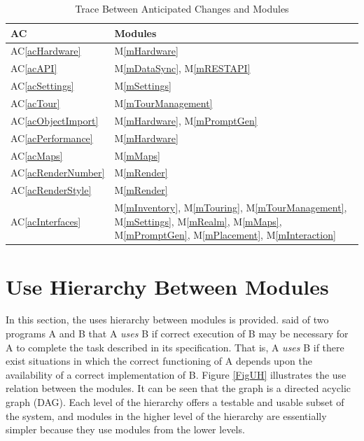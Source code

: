 \documentclass[12pt, titlepage]{article}
\newcommand{\acref}[1]{AC\ref{#1}}
\newcommand{\mref}[1]{M\ref{#1}}
\begin{document}
\begin{table}[H]
\centering
\begin{tabular}{p{} p{}}
\toprule
\textbf{AC} & \textbf{Modules}\\
\midrule
\acref{acHardware} & \mref{mHardware}\\
\acref{acAPI} & \mref{mDataSync}, \mref{mRESTAPI}\\
\acref{acSettings} & \mref{mSettings}\\
\acref{acTour} & \mref{mTourManagement}\\
\acref{acObjectImport} & \mref{mHardware}, \mref{mPromptGen}\\
\acref{acPerformance} & \mref{mHardware}\\
\acref{acMaps} & \mref{mMaps}\\
\acref{acRenderNumber} & \mref{mRender}\\
\acref{acRenderStyle} & \mref{mRender}\\
\acref{acInterfaces} & \mref{mInventory}, \mref{mTouring}, \mref{mTourManagement}, \mref{mSettings}, \mref{mRealm}, \mref{mMaps}, \mref{mPromptGen}, \mref{mPlacement}, \mref{mInteraction}\\
\bottomrule
\end{tabular}
\caption{Trace Between Anticipated Changes and Modules}
\label{TblACT}
\end{table}

\newpage

\section{Use Hierarchy Between Modules} \label{SecUse}

In this section, the uses hierarchy between modules is
provided. \citet{Parnas1978} said of two programs A and B that A {\em uses} B if
correct execution of B may be necessary for A to complete the task described in
its specification. That is, A {\em uses} B if there exist situations in which
the correct functioning of A depends upon the availability of a correct
implementation of B.  Figure \ref{FigUH} illustrates the use relation between
the modules. It can be seen that the graph is a directed acyclic graph
(DAG). Each level of the hierarchy offers a testable and usable subset of the
system, and modules in the higher level of the hierarchy are essentially simpler
because they use modules from the lower levels.
\end{document}
